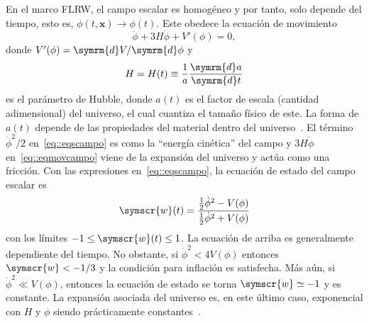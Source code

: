 En el marco FLRW, el campo escalar es homogéneo y por tanto, solo depende del tiempo, esto es, \(\phi\left(t,\symbf{x}\right)\rightarrow\phi(t)\). Este obedece la ecuación de movimiento
\begin{equation}
    \ddot{\phi}+3H\dot{\phi}+V'(\phi)=0,\label{eq::eqmovcampo}
\end{equation}
donde \(V'(\phi)=\symrm{d}V/\symrm{d}\phi\) y
\begin{equation}
    H=H(t)\equiv \frac{1}{a}\frac{\symrm{d}a}{\symrm{d}t}
\end{equation}
es el parámetro de Hubble, donde \(a(t)\) es el factor de escala (cantidad adimensional) del universo, el cual cuantiza el tamaño físico de este. La forma de \(a(t)\) depende de las propiedades del material dentro del universo~\cite{liddle1998introduction}. El término \(\dot{\phi}^2/2\) en~\ref{eq::eqscampo} es como la ``energía cinética'' del campo y \(3H\dot{\phi}\) en~\ref{eq::eqmovcampo} viene de la expansión del universo y actúa como una fricción. Con las expresiones en~\ref{eq::eqscampo}, la ecuación de estado del campo escalar es
\begin{equation}
    \symscr{w}(t)=\frac{\frac{1}{2}\dot{\phi}^2-V(\phi)}{\frac{1}{2}\dot{\phi}^2+V(\phi)}\label{eq::estado}
\end{equation}
con los límites \(-1\leq\symscr{w}(t)\leq 1\). La ecuación de arriba es generalmente dependiente del tiempo. No obstante, si \(\dot{\phi}^2<4V(\phi)\) entonces \(\symscr{w} < -1/3\) y la condición para inflación es satisfecha. Más aún, si \(\dot{\phi}^2 \ll V(\phi)\), entonces la ecuación de estado se torna \(\symscr{w}\simeq -1\) y es constante. La expansión asociada del universo es, en este último caso, exponencial con \(H\) y \(\phi\) siendo prácticamente constantes~\cite{knobel2012introduction}.
